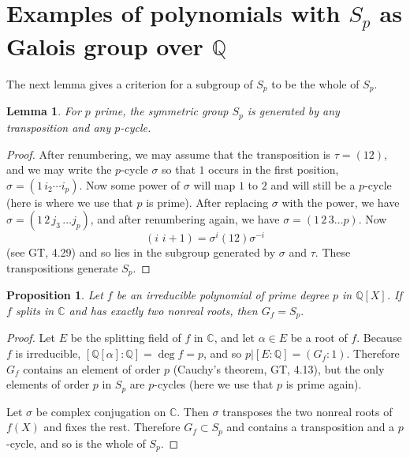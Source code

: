 \documentclass[a4paper,11pt,final,openany]{memoir}
\newtheorem{lemma}[X]{Lemma}
\newtheorem{proposition}[X]{Proposition}
\theoremstyle{nonumberplain}
\newtheorem{proof}{Proof.}
\begin{document}
\section{Examples of polynomials with \texorpdfstring{$S_{p}$}{Sp} as Galois
group over \texorpdfstring{$\mathbb{Q}$}{Q}}

\noindent The next lemma gives a criterion for a subgroup of $S_{p}$ to be the
whole of $S_{p}$.

\begin{lemma}
\label{cg12}For $p$ prime, the symmetric group $S_{p}$ is generated by any
transposition and any $p$-cycle.
\end{lemma}

\begin{proof}
After renumbering, we may assume that the transposition is $\tau=(12)$, and we
may write the $p$-cycle $\sigma$ so that $1$ occurs in the first position,
$\sigma=(1\,i_{2}\cdots i_{p})$. Now some power of $\sigma$ will map $1$ to
$2$ and will still be a $p$-cycle (here is where we use that $p$ is prime).
After replacing $\sigma$ with the power, we have $\sigma=(1\,2\,j_{3}\,\ldots
j_{p})$, and after renumbering again, we have $\sigma=(1\,2\,3\ldots p).$ Now%
\[
(i\,\,i+1)=\sigma^{i}(12)\sigma^{-i}%
\]
(see GT, 4.29) and so lies in the subgroup generated by $\sigma$ and
$\tau$. These transpositions generate $S_{p}$.
\end{proof}

\begin{proposition}
\label{cg13} Let $f$ be an irreducible polynomial of prime degree $p$ in
$\mathbb{Q}[X]$. If $f$ splits in $\mathbb{C}$ and has exactly two nonreal
roots, then $G_{f}=S_{p}.$
\end{proposition}

\begin{proof}
Let $E$ be the splitting field of $f$ in $\mathbb{C}{}$, and let $\alpha\in E$
be a root of $f$. Because $f$ is irreducible, $[\mathbb{Q}[\alpha
]\colon\mathbb{Q}]=\deg f=p$, and so $p|[E\colon\mathbb{Q}]=(G_{f}\colon1)$.
Therefore $G_{f}$ contains an element of order $p$ (Cauchy's theorem, GT,
4.13), but the only elements of order $p$ in $S_{p}$ are $p$-cycles
(here we use that $p$ is prime again).

Let $\sigma$ be complex conjugation on $\mathbb{C}$. Then $\sigma$ transposes
the two nonreal roots of $f(X)$ and fixes the rest. Therefore $G_{f}\subset
S_{p}$ and contains a transposition and a $p$-cycle, and so is the whole of
$S_{p}$.
\end{proof}
\end{document}
